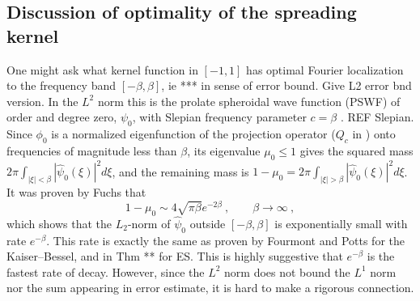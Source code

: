 \documentclass[10pt]{article}
\newcommand{\be}{\begin{equation}}
\newcommand{\ee}{\end{equation}}
\newcommand{\freq}{\beta}          %
\newcommand{\KB}{Kaiser--Bessel}
\begin{document}
\subsection{Discussion of optimality of the spreading kernel}
\label{s:optim}

One might ask what kernel function in $[-1,1]$ has optimal Fourier localization
to the frequency band $[-\freq,\freq]$,
ie *** in sense of error bound.
Give L2 error bnd version.
In the $L^2$ norm this is the prolate spheroidal wave function (PSWF)
of order and degree zero, $\psi_0$,
with Slepian frequency parameter $c=\freq$
\cite{osipov}. REF Slepian.
Since $\phi_0$ is a normalized eigenfunction of the projection operator
($Q_c$ in \cite{osipov}) onto frequencies
of magnitude less than $\freq$,
its eigenvalue $\mu_0\le 1$ gives the
squared mass
$2\pi \int_{|\xi|<\freq}|\hat\psi_0(\xi)|^2 d\xi$,
and the remaining mass is
$1-\mu_0 =2\pi \int_{|\xi|>\freq}|\hat\psi_0(\xi)|^2 d\xi$.
It was proven by Fuchs \cite{fuchs} that
\be
1 - \mu_0 \sim 4\sqrt{\pi\freq} e^{-2\freq} ~, \qquad \freq\to\infty~,
\label{fuchs}
\ee
which shows that the $L_2$-norm of $\hat\psi_0$ outside
$[-\freq,\freq]$ is exponentially small with rate $e^{-\freq}$.
This rate is exactly the same as
proven by Fourmont and Potts for the \KB, and in Thm ** for ES.
This is highly suggestive that $e^{-\freq}$ is the fastest
rate of decay.
However, since the $L^2$ norm does not bound the $L^1$ norm
nor the sum appearing in error estimate,
it is hard to make a rigorous connection.
\end{document}
